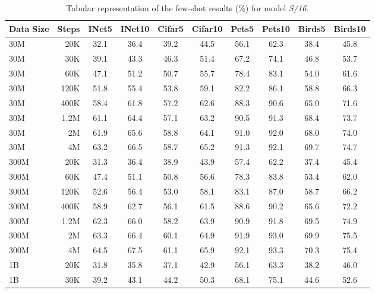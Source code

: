 \begin{table}[t]
  \setlength{\tabcolsep}{5pt}
  \setlength{\extrarowheight}{5pt}
  \renewcommand{\arraystretch}{0.75}
  \centering
  \caption{Tabular representation of the few-shot results (\%) for model \emph{S/16}.}\label{tbl:s_16}
  \begin{tabulary}{1.0\textwidth}{l r c c c c c c c c}
    \toprule[1pt]
    \bf{Data Size} & \bf{Steps} & \bf{INet5} & \bf{INet10} & \bf{Cifar5} & \bf{Cifar10} & \bf{Pets5} & \bf{Pets10} & \bf{Birds5} & \bf{Birds10} \\
    \midrule
30M   & 20K   & 32.1 & 36.4 & 39.2 & 44.5 & 56.1 & 62.3 & 38.4 & 45.8 \\
30M   & 30K   & 39.1 & 43.3 & 46.3 & 51.4 & 67.2 & 74.1 & 46.8 & 53.7 \\
30M   & 60K   & 47.1 & 51.2 & 50.7 & 55.7 & 78.4 & 83.1 & 54.0 & 61.6 \\
30M   & 120K  & 51.8 & 55.4 & 53.8 & 59.1 & 82.2 & 86.1 & 58.8 & 66.3 \\
30M   & 400K  & 58.4 & 61.8 & 57.2 & 62.6 & 88.3 & 90.6 & 65.0 & 71.6 \\
30M   & 1.2M  & 61.1 & 64.4 & 57.1 & 63.2 & 90.5 & 91.3 & 68.4 & 73.7 \\
30M   & 2M    & 61.9 & 65.6 & 58.8 & 64.1 & 91.0 & 92.0 & 68.0 & 74.0 \\
30M   & 4M    & 63.2 & 66.5 & 58.7 & 65.2 & 91.3 & 92.1 & 69.7 & 74.7 \\
\midrule[0.25pt]
300M  & 20K   & 31.3 & 36.4 & 38.9 & 43.9 & 57.4 & 62.2 & 37.4 & 45.4 \\
300M  & 60K   & 47.4 & 51.1 & 50.8 & 56.6 & 78.3 & 83.8 & 53.4 & 62.0 \\
300M  & 120K  & 52.6 & 56.4 & 53.0 & 58.1 & 83.1 & 87.0 & 58.7 & 66.2 \\
300M  & 400K  & 58.9 & 62.7 & 56.1 & 61.5 & 88.6 & 90.2 & 65.6 & 72.2 \\
300M  & 1.2M  & 62.3 & 66.0 & 58.2 & 63.9 & 90.9 & 91.8 & 69.5 & 74.9 \\
300M  & 2M    & 63.3 & 66.4 & 60.1 & 64.9 & 91.9 & 93.0 & 69.9 & 75.5 \\
300M  & 4M    & 64.5 & 67.5 & 61.1 & 65.9 & 92.1 & 93.3 & 70.3 & 75.4 \\
\midrule[0.25pt]
1B    & 20K   & 31.8 & 35.8 & 37.1 & 42.9 & 56.1 & 63.3 & 38.2 & 46.0 \\
1B    & 30K   & 39.2 & 43.1 & 44.2 & 50.3 & 68.1 & 75.1 & 44.6 & 52.6 \\

\end{tabulary}
\end{table}
